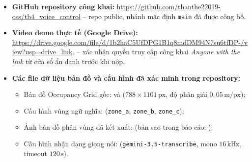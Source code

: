 \begin{itemize}[leftmargin=1.2cm]
  \item \textbf{GitHub repository công khai:} \url{https://github.com/thanthe22019-oss/tb4_voice_control} -- repo public, nhánh mặc định \texttt{main} đã được công bố.
  \item \textbf{Video demo thực tế (Google Drive):} \url{https://drive.google.com/file/d/1b2haC5UfDPG1B1q8mdDM94N7su6tfDP-/view?usp=drive_link}. \pending{} -- xác nhận quyền truy cập công khai \textit{Anyone with the link} từ cửa sổ ẩn danh trước khi nộp.
  \item \textbf{Các file dữ liệu bản đồ và cấu hình đã xác minh trong repository:}
  \begin{itemize}
    \item Bản đồ Occupancy Grid gốc:  và  ($788 \times 1101\,\text{px}$, độ phân giải $0{,}05\,\text{m/px}$);
    \item Cấu hình vùng ngữ nghĩa:  (\texttt{zone\_a}, \texttt{zone\_b}, \texttt{zone\_c});
    \item Ảnh bản đồ phân vùng đã kết xuất:  (bản sao trong báo cáo: );
    \item Cấu hình nhận dạng giọng nói:  (\texttt{gemini-3.5-transcribe}, mono $16\,\text{kHz}$, timeout $120\,\text{s}$).
  \end{itemize}
\end{itemize}
